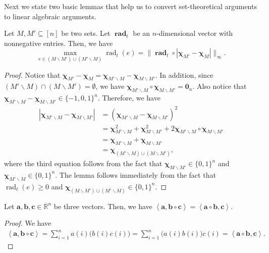 \documentclass{article}
\newcommand{\del}{\backslash}
\newcommand{\RR}{\mathbb R}
\DeclareMathOperator{\rad}{rad}
\newcommand{\inn}[1]{\left\langle #1 \right\rangle}
\renewcommand{\vec}[1]{\boldsymbol{#1}}
\renewcommand{\odot}{\circ}
\begin{document}
Next we state two basic lemmas that help us to convert set-theoretical arguments to linear algebraic arguments.
\begin{lemma}
\label{lemma:max}
Let $M, M' \subseteq [n]$ be two sets. Let $\vec \rad_t$ be an $n$-dimensional vector with nonnegative entries.
Then, we have 
$$ \max_{e \in (M\del M') \cup (M'\del M)} \rad_t(e) = \big\|\vec \rad_t \odot |\vec \chi_{M'} - \vec \chi_M| \big\|_\infty.$$
\end{lemma}

\begin{proof}
Notice that $\vec\chi_{M'}-\vec\chi_{M} = \vec\chi_{M'\del M}-\vec\chi_{M\del M'}$.
In addition, since $(M'\del M) \cap (M\del M') = \emptyset$, we have
$\vec \chi_{M'\del M} \odot \vec\chi_{M\del M'} = \vec 0_n$. 
Also notice that $ \vec\chi_{M'\del M}-\vec\chi_{M\del M'} \in \{-1,0,1\}^n$.
Therefore, we have
\begin{align*}
|\vec\chi_{M'\del M}-\vec\chi_{M\del M'}| 
&= (\vec\chi_{M'\del M}-\vec\chi_{M\del M'})^2\\
&=\vec\chi_{M'\del M}^2+\vec\chi_{M\del M'}^2+2\vec \chi_{M'\del M} \odot \vec\chi_{M\del M'} \\
&=\vec\chi_{M'\del M}+\vec\chi_{M\del M'}\\
& = \vec\chi_{(M' \del M) \cup (M\del M')},
\end{align*}
where the third equation follows from the fact that $\vec\chi_{M\del M'}\in \{0,1\}^n$ and $\vec\chi_{M'\del M}\in\{0,1\}^n$.
The lemma follows immediately from the fact that $\rad_t(e) \ge 0$ and  $\vec\chi_{(M\del M')\cup(M'\del M)}\in \{0,1\}^n$.
\end{proof}

\begin{lemma}
\label{lemma:vector-technical}
Let $\vec a,\vec b, \vec c \in \RR^n$ be three vectors.
Then, we have $\inn{\vec a, \vec b\odot \vec c} = \inn{\vec a\odot \vec b,\vec c}$.
\end{lemma}

\begin{proof}
We have
\begin{align*}
	\inn{\vec a,\vec b\odot \vec c} = \sum_{i=1}^n a(i) \big(b(i) c(i)\big) = \sum_{i=1}^n \big(a(i)b(i)\big)c(i) = \inn{\vec a\odot\vec b,\vec c}.
\end{align*}
\end{proof}
\end{document}
